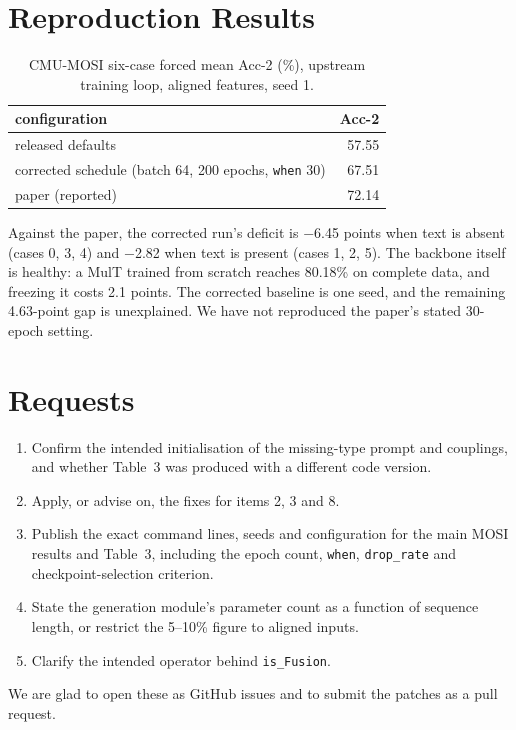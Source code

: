 \documentclass[lettersize,journal]{IEEEtran}
\begin{document}
\section{Reproduction Results}
\begin{table}[!h]
\caption{CMU-MOSI six-case forced mean Acc-2 (\%), upstream training loop, aligned features, seed 1.\label{tab:repro}}
\centering
\begin{tabular}{lr}
\toprule
configuration & Acc-2\\
\midrule
released defaults & 57.55\\
corrected schedule (batch 64, 200 epochs, \texttt{when} 30) & 67.51\\
paper (reported) & 72.14\\
\bottomrule
\end{tabular}
\end{table}
Against the paper, the corrected run's deficit is $-$6.45 points when text is absent (cases 0, 3, 4) and $-$2.82 when text is present (cases 1, 2, 5). The backbone itself is healthy: a MulT trained from scratch reaches 80.18\% on complete data, and freezing it costs 2.1 points. The corrected baseline is one seed, and the remaining 4.63-point gap is unexplained. We have not reproduced the paper's stated 30-epoch setting.

\section{Requests}
\begin{enumerate}
\item Confirm the intended initialisation of the missing-type prompt and couplings, and whether Table~3 was produced with a different code version.
\item Apply, or advise on, the fixes for items 2, 3 and 8.
\item Publish the exact command lines, seeds and configuration for the main MOSI results and Table~3, including the epoch count, \texttt{when}, \texttt{drop\_rate} and checkpoint-selection criterion.
\item State the generation module's parameter count as a function of sequence length, or restrict the 5--10\% figure to aligned inputs.
\item Clarify the intended operator behind \texttt{is\_Fusion}.
\end{enumerate}
We are glad to open these as GitHub issues and to submit the patches as a pull request.
\end{document}

